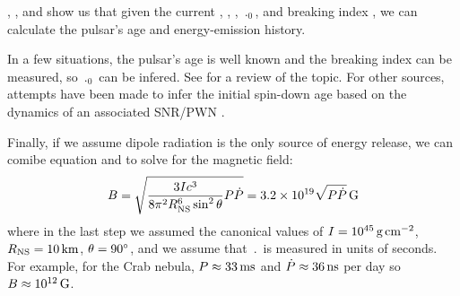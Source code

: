 , ,
and  show us that given the current \period,
\perioddot, \energydot, $\period_0$, and breaking index \breakingindex,
we can calculate the pulsar's age and energy-emission history.

In a few situations, the pulsar's age is well known and the breaking index can be
measured, so $\period_0$ can be infered. See \cite{kaspi_2002_constraining-birth}
for a review of the topic. For other sources, attempts have been
made to infer the initial spin-down age based on the dynamics of an
associated \ac{SNR}/\ac{PWN} \citep{van-der-swaluw_2001_inferring-initial}.

Finally, if we assume dipole radiation is the only source of energy release, we
can comibe equation  and 
to solve for the magnetic field:
\begin{equation}
  B = \sqrt{\frac{3Ic^3}{8\pi^2R_\text{NS}^6\sin^2\theta}P\dot{P}}
  = 3.2\times 10^{19} \sqrt{P\dot{P}} \,\text{G}
\end{equation}
where in the last step we assumed the canonical values of $I=10^{45}\,\text{g}\,\text{cm}^{-2}$,
$R_\text{NS}=10\,\text{km}$, $\theta=90^\circ$, and we
assume that $\period$ is measured in units of seconds.
For example, for the Crab nebula, $P\approx33\,\text{ms}$ 
\citep{staelin_1968_pulsating-radio}
and $\dot{P}\approx36\,\text{ns}$ per day
\citep{richards_1969a_period-pulsar}
so $B\approx10^{12}\,\text{G}$.
